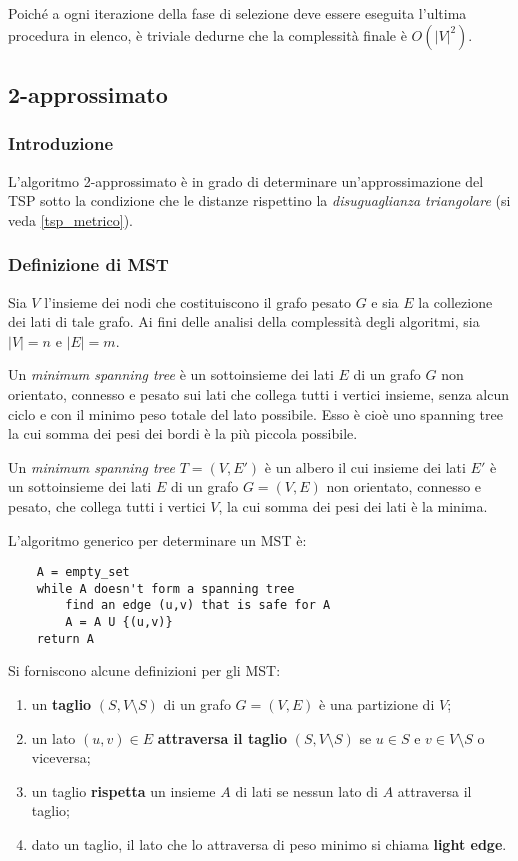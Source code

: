 Poiché a ogni iterazione della fase di selezione deve essere eseguita l'ultima procedura in elenco, è triviale dedurne che la complessità finale è $O(|V|^2)$.

\subsection{2-approssimato}

\subsubsection{Introduzione}

L'algoritmo 2-approssimato è in grado di determinare un'approssimazione del TSP sotto la condizione che le
distanze rispettino la \textit{disuguaglianza triangolare} (si veda \ref{tsp_metrico}).

\subsubsection{Definizione di MST}

Sia $V$ l'insieme dei nodi che costituiscono il grafo pesato $G$ e sia $E$ la collezione dei lati di tale
grafo. Ai fini delle analisi della complessità degli algoritmi, sia $|V| = n$ e $|E| = m$.

Un \textit{minimum spanning tree} è un
sottoinsieme dei lati $E$ di un grafo $G$ non orientato, connesso e pesato sui lati che
collega tutti i vertici insieme, senza alcun ciclo e con il minimo peso totale del
lato possibile. Esso è cioè uno spanning tree la cui somma dei pesi dei bordi è la più
piccola possibile.

Un \textit{minimum spanning tree} $T = (V, E')$ è un albero il cui insieme dei lati $E'$ è un
sottoinsieme dei lati $E$ di un grafo $G = (V, E)$ non orientato, connesso e
pesato, che collega tutti i vertici $V$, la cui somma dei pesi dei lati è la minima.

L'algoritmo generico per determinare un MST è:
\begin{verbatim}
    A = empty_set
    while A doesn't form a spanning tree
        find an edge (u,v) that is safe for A
        A = A U {(u,v)}
    return A
\end{verbatim}

Si forniscono alcune definizioni per gli MST:
\begin{enumerate}
    \item un \textbf{taglio} $(S, V \setminus S)$ di un grafo $G = (V, E)$ è una partizione
    di $V$;
    \item un lato $(u, v) \in E$ \textbf{attraversa il taglio} $(S, V \setminus S)$ se
    $u \in S$ e $v \in V \setminus S$ o viceversa;
    \item un taglio \textbf{rispetta} un insieme $A$ di lati se nessun lato di $A$ attraversa
    il taglio;
    \item dato un taglio, il lato che lo attraversa di peso minimo si chiama \textbf{light edge}.
\end{enumerate}

